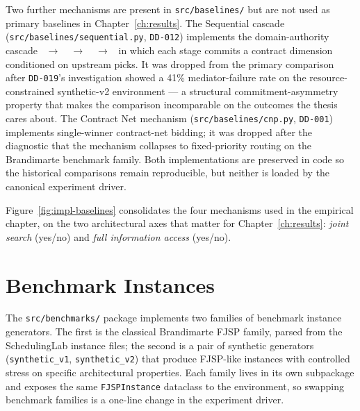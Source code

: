 Two further mechanisms are present in \texttt{src/baselines/} but
are not used as primary baselines in Chapter~\ref{ch:results}. The
Sequential cascade
(\texttt{src/baselines/sequential.py}, \texttt{DD-012}) implements the
domain-authority cascade \PSA{}~$\to$~\PMA{}~$\to$~\QCA{}~$\to$~\SCA{}
in which each stage commits a contract dimension conditioned on
upstream picks. It was dropped from the primary comparison after
\texttt{DD-019}'s investigation showed a 41\% mediator-failure rate on
the resource-constrained synthetic-v2 environment --- a structural
commitment-asymmetry property that makes the comparison incomparable on
the outcomes the thesis cares about. The Contract Net mechanism
(\texttt{src/baselines/cnp.py}, \texttt{DD-001}) implements single-winner
contract-net bidding; it was dropped after the diagnostic that the
mechanism collapses to fixed-priority routing on the Brandimarte
benchmark family. Both implementations are preserved in code so the
historical comparisons remain reproducible, but neither is loaded by
the canonical experiment driver.

Figure~\ref{fig:impl-baselines} consolidates the four mechanisms used
in the empirical chapter, on the two architectural axes that matter
for Chapter~\ref{ch:results}: \emph{joint search} (yes/no) and
\emph{full information access} (yes/no).


\section{Benchmark Instances}
\label{sec:impl-benchmarks}

The \texttt{src/benchmarks/} package implements two families of
benchmark instance generators. The first is the classical Brandimarte
\cite{brandimarte1993} FJSP family, parsed from the SchedulingLab
instance files; the second is a pair of synthetic generators
(\texttt{synthetic\_v1}, \texttt{synthetic\_v2}) that produce FJSP-like
instances with controlled stress on specific architectural properties.
Each family lives in its own subpackage and exposes the same
\texttt{FJSPInstance} dataclass to the environment, so swapping benchmark
families is a one-line change in the experiment driver.

